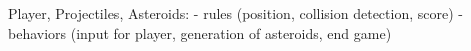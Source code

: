 
Player, Projectiles, Asteroids:
- rules (position, collision detection, score)
- behaviors (input for player, generation of asteroids, end game)